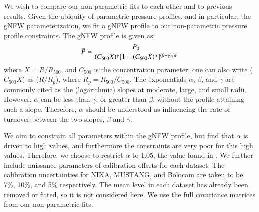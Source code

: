 \documentclass[twocolumn,traditabstract]{aa}
\begin{document}
We wish to compare our non-parametric fits to each other and to previous results. Given the ubiquity of
parametric pressure profiles, and in particular, the gNFW parameterization, we fit a gNFW profile
to our non-parametric pressure profile constraints. The gNFW profile is given as:
\begin{equation}
  \Tilde{P} = \frac{P_0}{(C_{500} X)^{\gamma} [1 + (C_{500} X)^{\alpha}]^{(\beta - \gamma)/\alpha}}
  \label{eqn:gnfw_profile}
\end{equation}
where $X = R / R_{500}$, and $C_{500}$ is the concentration parameter; one can also write ($C_{500} X$) as
($R / R_p$), where $R_p = R_{500}/C_{500}$. The exponentials $\alpha$, $\beta$, and $\gamma$ are commonly
cited as the (logarithmic) slopes at moderate, large, and small radii. However, $\alpha$ can be less than
$\gamma$, or greater than $\beta$, without the profile attaining such a slope. Therefore, $\alpha$ should
be understood as influencing the rate of turnover between the two slopes, $\beta$ and $\gamma$. 


We aim to constrain all parameters within the gNFW profile, but find that $\alpha$ is driven to high values, and
furthermore the constraints are very poor for this high values. Therefore, we choose to restrict $\alpha$ to 1.05,
the value found in \citet{arnaud2010}. We further include nuissance parameters of calibration offsets for each dataset.
The calibration uncertainties for NIKA, MUSTANG, and Bolocam are taken to be 7\%, 10\%, and 5\% respectively.
The mean level in each dataset has already been removed or fitted, so it is not considered here. We use the full
covariance matrices from our non-parametric fits.

\end{document}
